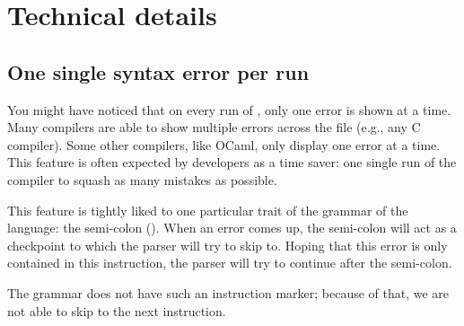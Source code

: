\section{Technical details}\label{sec-technical-details}%

\subsection{One single syntax error per run}\label{sec-one-single-syntax-error-per-run}%

\noindent You might have noticed that on every run of , only one error is
shown at a time. Many compilers are able to show multiple errors across
the file (e.g., any C compiler). Some other compilers, like OCaml, only
display one error at a time. This feature is often expected by developers
as a time saver: one single run of the compiler to squash as many
mistakes as possible.%

This feature is tightly liked to one particular trait of the grammar of
the language: the semi-colon (\mdcode{;}). When an error comes up, the
semi-colon will act as a checkpoint to which the parser will try to skip
to. Hoping that this error is only contained in this instruction, the
parser will try to continue after the semi-colon.%

The \touist grammar does not have such an instruction marker; because of
that, we are not able to skip to the next instruction.%